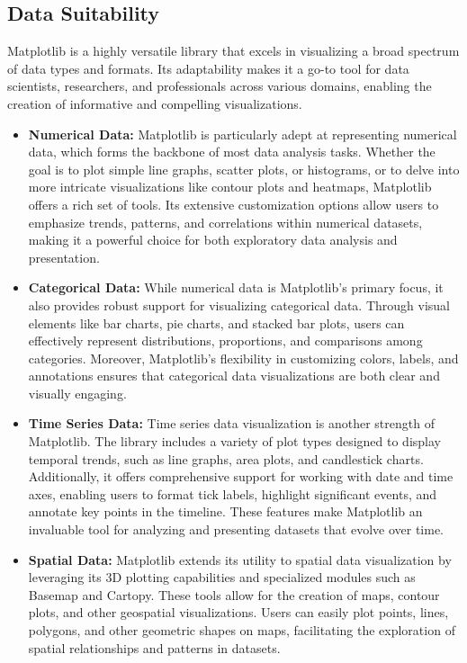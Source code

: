 \subsection{Data Suitability}

Matplotlib is a highly versatile library that excels in visualizing a broad spectrum of data types and formats. Its adaptability makes it a go-to tool for data scientists, researchers, and professionals across various domains, enabling the creation of informative and compelling visualizations.

\begin{itemize}
	\item \textbf{Numerical Data:} Matplotlib is particularly adept at representing numerical data, which forms the backbone of most data analysis tasks. Whether the goal is to plot simple line graphs, scatter plots, or histograms, or to delve into more intricate visualizations like contour plots and heatmaps, Matplotlib offers a rich set of tools. Its extensive customization options allow users to emphasize trends, patterns, and correlations within numerical datasets, making it a powerful choice for both exploratory data analysis and presentation.
	
	\item \textbf{Categorical Data:} While numerical data is Matplotlib's primary focus, it also provides robust support for visualizing categorical data. Through visual elements like bar charts, pie charts, and stacked bar plots, users can effectively represent distributions, proportions, and comparisons among categories. Moreover, Matplotlib's flexibility in customizing colors, labels, and annotations ensures that categorical data visualizations are both clear and visually engaging.
	
	\item \textbf{Time Series Data:} Time series data visualization is another strength of Matplotlib. The library includes a variety of plot types designed to display temporal trends, such as line graphs, area plots, and candlestick charts. Additionally, it offers comprehensive support for working with date and time axes, enabling users to format tick labels, highlight significant events, and annotate key points in the timeline. These features make Matplotlib an invaluable tool for analyzing and presenting datasets that evolve over time.
	
	\item \textbf{Spatial Data:} Matplotlib extends its utility to spatial data visualization by leveraging its 3D plotting capabilities and specialized modules such as Basemap and Cartopy. These tools allow for the creation of maps, contour plots, and other geospatial visualizations. Users can easily plot points, lines, polygons, and other geometric shapes on maps, facilitating the exploration of spatial relationships and patterns in datasets.
	

\end{itemize}
